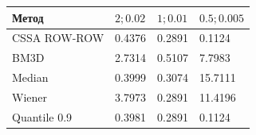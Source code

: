 \begin{tabular}{|l|l|l|l|}
\hline
Метод & $2; 0.02$ & $1; 0.01$ & $0.5; 0.005$ \\
\hline
CSSA ROW-ROW & 0.4376 & 0.2891 & 0.1124 \\
\hline
BM3D & 2.7314 & 0.5107 & 7.7983 \\
\hline
Median & 0.3999 & 0.3074 & 15.7111 \\
\hline
Wiener & 3.7973 & 0.2891 & 11.4196 \\
\hline
Quantile 0.9 & 0.3981 & 0.2891 & 0.1124 \\
\hline
\end{tabular}
